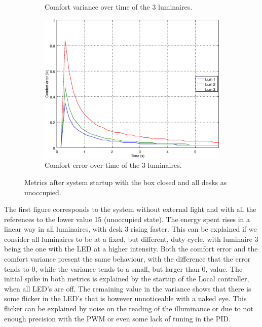 \begin{figure}[ht]
\begin{subfigure}[t]{0.32\textwidth}
    \caption{Comfort variance over time of the 3 luminaires.}
    \label{fig:f_closed_o000}
    \end{subfigure}
    \begin{subfigure}[t]{0.32\textwidth}
    \centering
    \includegraphics[width=.95\textwidth]{img/n_closed_o000}
    \caption{Comfort error over time of the 3 luminaires.}
    \label{fig:n_closed_o000}
    \end{subfigure}
    \caption{Metrics after system startup with the box closed and all desks as unoccupied. }
    \label{fig:closed_o000}
\end{figure}

The first figure corresponds to the system without external light and with all the references to the lower value 15 (unoccupied state). The energy spent rises in a linear way in all luminaires, with desk 3 rising faster. This can be explained if we consider all luminaires to be at a fixed, but different, duty cycle, with luminaire 3 being the one with the LED at a higher intensity. Both the comfort error and the comfort variance present the same behaviour, with the difference that the error tends to 0, while the variance tends to a small, but larger than 0, value. The initial spike in both metrics is explained by the startup of the Local controller, when all LED's are off. The remaining value in the variance shows that there is some flicker in the LED's that is however unnoticeable with a naked eye. This flicker can be explained by noise on the reading of the illuminance or due to not enough precision with the PWM or even some lack of tuning in the PID.

